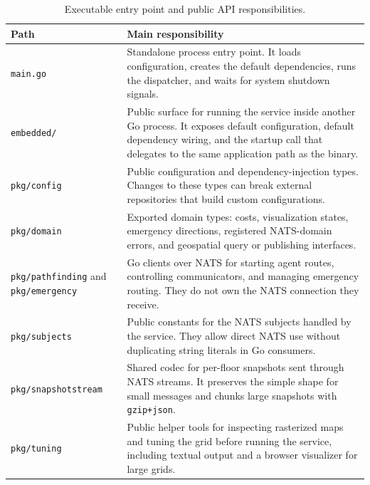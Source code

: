 \documentclass[12pt,a4paper]{report}
\begin{document}
\begin{table}[H]
\centering
\begin{tabular}{|p{}|p{}|}
\hline
\textbf{Path} & \textbf{Main responsibility} \\
\hline
\texttt{main.go} &
Standalone process entry point. It loads configuration, creates the default
dependencies, runs the dispatcher, and waits for system shutdown signals. \\
\hline
\texttt{embedded/} &
Public surface for running the service inside another Go process. It exposes
default configuration, default dependency wiring, and the startup call that
delegates to the same application path as the binary. \\
\hline
\texttt{pkg/config} &
Public configuration and dependency-injection types. Changes to these types can
break external repositories that build custom configurations. \\
\hline
\texttt{pkg/domain} &
Exported domain types: costs, visualization states, emergency directions,
registered NATS-domain errors, and geospatial query or publishing interfaces. \\
\hline
\texttt{pkg/pathfinding} and \texttt{pkg/emergency} &
Go clients over NATS for starting agent routes, controlling communicators, and
managing emergency routing. They do not own the NATS connection they receive. \\
\hline
\texttt{pkg/subjects} &
Public constants for the NATS subjects handled by the service. They allow direct
NATS use without duplicating string literals in Go consumers. \\
\hline
\texttt{pkg/}\newline\texttt{snapshotstream} &
Shared codec for per-floor snapshots sent through NATS streams. It preserves the
simple shape for small messages and chunks large snapshots with
\texttt{gzip+json}. \\
\hline
\texttt{pkg/tuning} &
Public helper tools for inspecting rasterized maps and tuning the grid before
running the service, including textual output and a browser visualizer for large
grids. \\
\hline
\end{tabular}
\caption{Executable entry point and public API responsibilities.}
\end{table}
\end{document}
